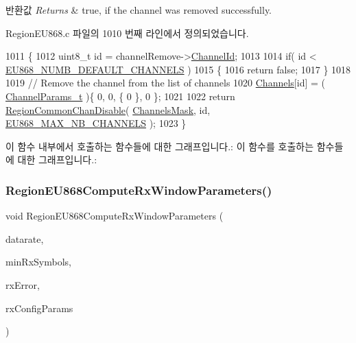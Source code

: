 \begin{DoxyRetVals}{반환값}
{\em Returns} & true, if the channel was removed successfully. \\
\hline
\end{DoxyRetVals}


Region\+E\+U868.\+c 파일의 1010 번째 라인에서 정의되었습니다.


\begin{DoxyCode}
1011 \{
1012     uint8\_t \textcolor{keywordtype}{id} = channelRemove->\mbox{\hyperlink{structs_channel_remove_params_ae23f953dc29c360e56a3c856404a3276}{ChannelId}};
1013 
1014     \textcolor{keywordflow}{if}( \textcolor{keywordtype}{id} < \mbox{\hyperlink{group___r_e_g_i_o_n_e_u868_ga43b13bdefab43add062b907facaef8ba}{EU868\_NUMB\_DEFAULT\_CHANNELS}} )
1015     \{
1016         \textcolor{keywordflow}{return} \textcolor{keyword}{false};
1017     \}
1018 
1019     \textcolor{comment}{// Remove the channel from the list of channels}
1020     \mbox{\hyperlink{_region_e_u868_8c_a2f381382b4cbbe721da7b980ec467229}{Channels}}[id] = ( \mbox{\hyperlink{group___l_o_r_a_m_a_c_ga1360ca6f82c6d125ea43a9dad9b56184}{ChannelParams\_t}} )\{ 0, 0, \{ 0 \}, 0 \};
1021 
1022     \textcolor{keywordflow}{return} \mbox{\hyperlink{group___r_e_g_i_o_n_c_o_m_m_o_n_ga695c0ab2a06edcae5b33772f639fb676}{RegionCommonChanDisable}}( \mbox{\hyperlink{_region_e_u868_8c_a2188957b5ca6af8092154d7ccbfa5757}{ChannelsMask}}, \textcolor{keywordtype}{id}, 
      \mbox{\hyperlink{group___r_e_g_i_o_n_e_u868_gaf94c3090ac541fec3c97b2146702d252}{EU868\_MAX\_NB\_CHANNELS}} );
1023 \}
\end{DoxyCode}
이 함수 내부에서 호출하는 함수들에 대한 그래프입니다.\+:
이 함수를 호출하는 함수들에 대한 그래프입니다.\+:
\mbox{\label{group___r_e_g_i_o_n_e_u868_ga7650d2866d0b5df186afd4c0dd1f52bb}} 
\subsubsection{\texorpdfstring{Region\+E\+U868\+Compute\+Rx\+Window\+Parameters()}{RegionEU868ComputeRxWindowParameters()}}
{\footnotesize\ttfamily void Region\+E\+U868\+Compute\+Rx\+Window\+Parameters (\begin{DoxyParamCaption}\item[{int8\+\_\+t}]{datarate,  }\item[{uint8\+\_\+t}]{min\+Rx\+Symbols,  }\item[{uint32\+\_\+t}]{rx\+Error,  }\item[{\mbox{\hyperlink{group___r_e_g_i_o_n_ga375c038078dfcfc7ef14280021db719e}{Rx\+Config\+Params\+\_\+t}} $\ast$}]{rx\+Config\+Params }\end{DoxyParamCaption})}

